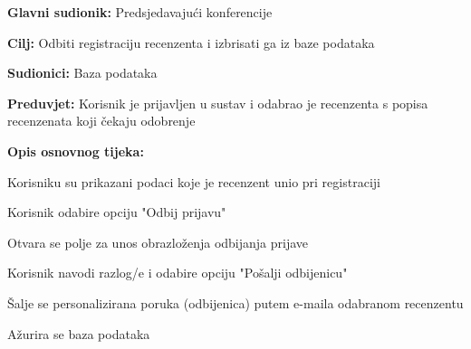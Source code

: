 					
					\noindent {}
					\begin{packed_item}
						
						\item \textbf{Glavni sudionik: } Predsjedavajući konferencije
						\item  \textbf{Cilj:} Odbiti registraciju recenzenta i izbrisati ga iz baze podataka
						\item  \textbf{Sudionici:} Baza podataka
						\item  \textbf{Preduvjet:} Korisnik je prijavljen u sustav i odabrao je recenzenta s popisa recenzenata koji čekaju odobrenje
						\item  \textbf{Opis osnovnog tijeka:}
						
						\item[] \begin{packed_enum}
							
							
							\item Korisniku su prikazani podaci koje je recenzent unio pri registraciji
							\item Korisnik odabire opciju "Odbij prijavu"
							\item Otvara se polje za unos obrazloženja odbijanja prijave
							\item Korisnik navodi razlog/e i odabire opciju "Pošalji odbijenicu"
							\item Šalje se personalizirana poruka (odbijenica) putem e-maila odabranom recenzentu
							\item Ažurira se baza podataka
							
							
						\end{packed_enum}
						
					\end{packed_item}
					

